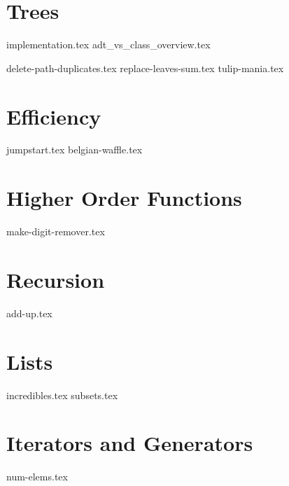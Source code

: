 \documentclass{exam}
\begin{document}
\section{Trees}
{implementation.tex}
{adt_vs_class_overview.tex}
\begin{questions}
    {delete-path-duplicates.tex}
    \newpage
    {replace-leaves-sum.tex}
    \newpage
    {tulip-mania.tex}
\end{questions}

\section{Efficiency}
\begin{questions}
    {jumpstart.tex}
    {belgian-waffle.tex}
\end{questions}

\section{Higher Order Functions}
\begin{questions}
    {make-digit-remover.tex}
\end{questions}

\section{Recursion}
\begin{questions}
    {add-up.tex}
\end{questions}

\section{Lists}
\begin{questions}
    {incredibles.tex}
    {subsets.tex}
\end{questions}

\newpage

\section{Iterators and Generators}
\begin{questions}
    {num-elems.tex}
\end{questions}
\end{document}
